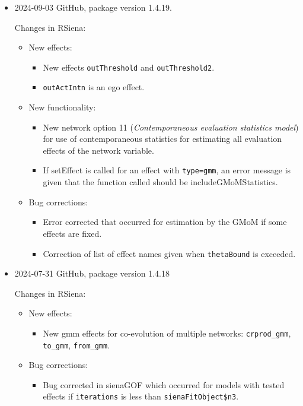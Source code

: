 \documentclass[a4paper,fleqn,11pt]{article}
\newcommand{\+}{\, + \,}
\newcommand{\sfn}[1]{\textsf{#1}}
\begin{document}
\begin{small}
\begin{itemize}
\item 2024-09-03 GitHub, package version 1.4.19.

Changes in RSiena:
\begin{itemize}
\item New effects:
   \begin{itemize}
  \item New effects \texttt{outThreshold} and \texttt{outThreshold2}.
  \item \texttt{outActIntn} is an ego effect.
    \end{itemize}
\item New functionality:
   \begin{itemize}
  \item New network option 11
    (\emph{Contemporaneous evaluation statistics model}) for use of
    contemporaneous statistics
    for estimating all evaluation effects of the network variable.
  \item If \sfn{setEffect} is called for an effect with \texttt{type=gmm}, an error message
    is given that the function called should be \sfn{includeGMoMStatistics}.
    \end{itemize}
\item Bug corrections:
   \begin{itemize}
  \item Error corrected that occurred for estimation by the GMoM if
    some effects are fixed.
  \item Correction of list of effect names given when \texttt{thetaBound} is exceeded.
    \end{itemize}
\end{itemize}


\item 2024-07-31 GitHub, package version 1.4.18


Changes in RSiena:
\begin{itemize}
\item New effects:
   \begin{itemize}
  \item New gmm effects for co-evolution of multiple networks:
    \texttt{crprod\_gmm}, \texttt{to\_gmm}, \texttt{from\_gmm}.
    \end{itemize}
\item Bug corrections:
   \begin{itemize}
  \item Bug corrected in \sfn{sienaGOF} which occurred for models with tested effects
    if \texttt{iterations} is less than \texttt{sienaFitObject\$n3}.
    \end{itemize}
\end{itemize}



\end{itemize}
\end{small}
\end{document}
